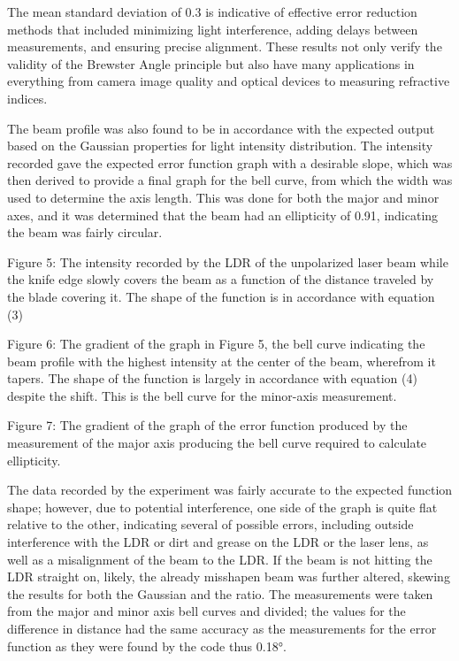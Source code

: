 \documentclass[11pt]{article}
\begin{document}
    The mean standard deviation of 0.3 is indicative of effective error
reduction methods that included minimizing light interference, adding
delays between measurements, and ensuring precise alignment. These
results not only verify the validity of the Brewster Angle principle but
also have many applications in everything from camera image quality and
optical devices to measuring refractive indices.

    The beam profile was also found to be in accordance with the expected
output based on the Gaussian properties for light intensity
distribution. The intensity recorded gave the expected error function
graph with a desirable slope, which was then derived to provide a final
graph for the bell curve, from which the width was used to determine the
axis length. This was done for both the major and minor axes, and it was
determined that the beam had an ellipticity of 0.91, indicating the beam
was fairly circular.

    Figure 5: The intensity recorded by the LDR of the unpolarized laser
beam while the knife edge slowly covers the beam as a function of the
distance traveled by the blade covering it. The shape of the function is
in accordance with equation (3)

    Figure 6: The gradient of the graph in Figure 5, the bell curve
indicating the beam profile with the highest intensity at the center of
the beam, wherefrom it tapers. The shape of the function is largely in
accordance with equation (4) despite the shift. This is the bell curve
for the minor-axis measurement.

    Figure 7: The gradient of the graph of the error function produced by
the measurement of the major axis producing the bell curve required to
calculate ellipticity.

    The data recorded by the experiment was fairly accurate to the expected
function shape; however, due to potential interference, one side of the
graph is quite flat relative to the other, indicating several of
possible errors, including outside interference with the LDR or dirt and
grease on the LDR or the laser lens, as well as a misalignment of the
beam to the LDR. If the beam is not hitting the LDR straight on, likely,
the already misshapen beam was further altered, skewing the results for
both the Gaussian and the ratio. The measurements were taken from the
major and minor axis bell curves and divided; the values for the
difference in distance had the same accuracy as the measurements for the
error function as they were found by the code thus 0.18°.
\end{document}
